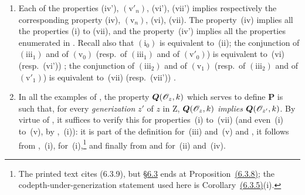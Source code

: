 \begin{remarks}[7.3.9]
\label{IV.7.3.9}
\begin{enumerate}[label=\emph{\roman*)}]
  \item Each of the properties (iv'), $(\mathrm{v}'_n)$, (vi'), (vii') implies respectively the corresponding property (iv), $(\mathrm{v}_n)$, (vi), (vii).
  The property~(iv) implies all the properties (i) to (vii), and the property~(iv') implies all the properties enumerated in .
  Recall also that $(\mathrm{i}_0)$ is equivalent to~(ii); the conjunction of $(\mathrm{iii}_1)$ and of $(\mathrm{v}_0)$ (resp.~of $(\mathrm{iii}_1)$ and of $(\mathrm{v}'_0)$) is equivalent to~(vi) (resp.~(vi')) ; the conjunction of $(\mathrm{iii}_2)$ and of $(\mathrm{v}_1)$ (resp.~of $(\mathrm{iii}_2)$ and of $(\mathrm{v}'_1)$) is equivalent to~(vii) (resp.~(vii')) .

  \item In all the examples of , the property $\boldsymbol{Q}(\mathscr{O}_z,k)$ which serves to define $\boldsymbol{P}$ is such that, for every \emph{generization} $z'$ of $z$ in $\mathrm{Z}$, $\boldsymbol{Q}(\mathscr{O}_z,k)$ \emph{implies} $\boldsymbol{Q}(\mathscr{O}_{z'},k)$.
  By virtue of , it suffices to verify this for properties~(i) to~(vii) (and even~(i) to~(v), by ,~(i)): it is part of the definition for~(iii) and~(v)  and , it follows from ,~(i), for~(i),\footnote{The printed text cites (6.3.9), but {\hyperref[subsection:IV.6.3]{\S6.3}} ends at Proposition~{\hyperref[IV.6.3.8]{(6.3.8)}}; the codepth-under-generization statement used here is Corollary~{\hyperref[IV.6.3.5]{(6.3.5)}}(i).} and finally from  and  for~(ii) and~(iv).
\end{enumerate}
\end{remarks}


